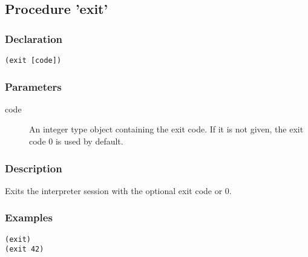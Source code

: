 \subsection{Procedure 'exit'}
\label{builtins/exit}

\subsubsection*{Declaration}
\begin{lstlisting}
(exit [code])
\end{lstlisting}

\subsubsection*{Parameters}
\begin{description}
	\item[code] An integer type object containing the exit code. If it is not given, the exit code 0 is used by default.
\end{description}

\subsubsection*{Description}
Exits the interpreter session with the optional exit code or 0.

\subsubsection*{Examples}
\begin{lstlisting}
(exit)
(exit 42)
\end{lstlisting}
